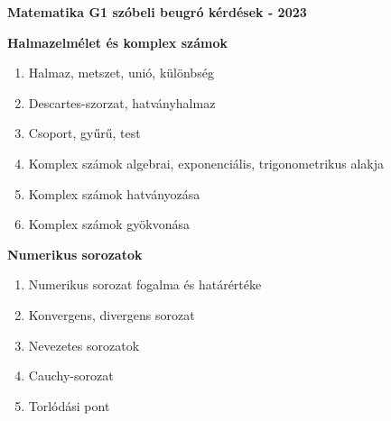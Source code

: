 \documentclass[11pt,a4paper]{article}
\begin{document}
\begin{center}
   \Large \textbf{Matematika G1 szóbeli beugró kérdések - 2023}
\end{center}
\textbf{Halmazelmélet és komplex számok}
\begin{enumerate}
    \item Halmaz, metszet, unió, különbség
    \item Descartes-szorzat, hatványhalmaz
    \item Csoport, gyűrű, test
    \item Komplex számok algebrai, exponenciális, trigonometrikus alakja
    \item Komplex számok hatványozása
    \item Komplex számok gyökvonása
\end{enumerate}
\textbf{Numerikus sorozatok}
\begin{enumerate}
    \item Numerikus sorozat fogalma és határértéke
    \item Konvergens, divergens sorozat
    \item Nevezetes sorozatok
    \item Cauchy-sorozat
    \item Torlódási pont
\end{enumerate}
\end{document}
